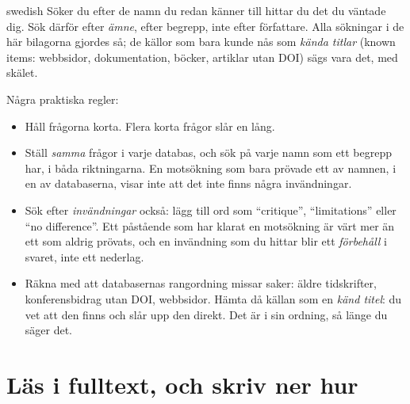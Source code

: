\begin{onlyin}{swedish}
Söker du efter de namn du redan känner till hittar du det du väntade
dig.  Sök därför efter \emph{ämne}, efter begrepp, inte efter
författare.  Alla sökningar i de här bilagorna gjordes så; de källor som
bara kunde nås som \emph{kända titlar}
(\foreignlanguage{english}{known items}: webbsidor, dokumentation,
böcker, artiklar utan DOI) sägs vara det, med skälet.

Några praktiska regler:
\begin{itemize}
  \item Håll frågorna korta.  Flera korta frågor slår en lång.
  \item Ställ \emph{samma} frågor i varje databas, och sök på varje namn
    som ett begrepp har, i båda riktningarna.  En motsökning som bara
    prövade ett av namnen, i en av databaserna, visar inte att det inte
    finns några invändningar.
  \item Sök efter \emph{invändningar} också: lägg till ord som
    \enquote{critique}, \enquote{limitations} eller \enquote{no
    difference}.  Ett påstående som har klarat en motsökning är värt
    mer än ett som aldrig prövats, och en invändning som du hittar blir
    ett \emph{förbehåll} i svaret, inte ett nederlag.
  \item Räkna med att databasernas rangordning missar saker: äldre
    tidskrifter, konferensbidrag utan DOI, webbsidor.  Hämta då källan
    som en \emph{känd titel}: du vet att den finns och slår upp den
    direkt.  Det är i sin ordning, så länge du säger det.
\end{itemize}
\end{onlyin}

\section{%
  {Läs i fulltext, och skriv ner hur}} %

